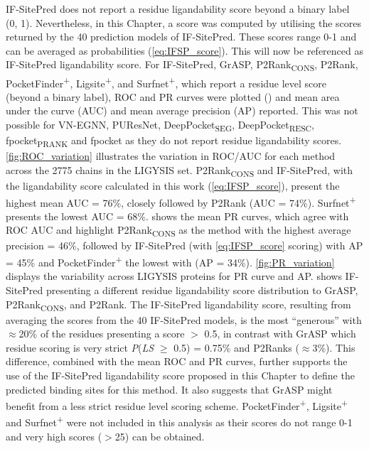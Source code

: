 IF-SitePred does not report a residue ligandability score beyond a binary label (0, 1). Nevertheless, in this Chapter, a score was computed by utilising the scores returned by the 40 prediction models of IF-SitePred. These scores range 0-1 and can be averaged as probabilities (\autoref{eq:IFSP_score}). This will now be referenced as IF-SitePred ligandability score. For IF-SitePred, GrASP, P2Rank\textsubscript{CONS}, P2Rank, PocketFinder\textsuperscript{+}, Ligsite\textsuperscript{+}, and Surfnet\textsuperscript{+}, which report a residue level score (beyond a binary label), ROC and PR curves were plotted () and mean area under the curve (AUC) and mean average precision (AP) reported. This was not possible for VN-EGNN, PUResNet, DeepPocket\textsubscript{SEG}, DeepPocket\textsubscript{RESC}, fpocket\textsubscript{PRANK} and fpocket as they do not report residue ligandability scores. \autoref{fig:ROC_variation} illustrates the variation in ROC/AUC for each method across the 2775 chains in the LIGYSIS set. P2Rank\textsubscript{CONS} and IF-SitePred, with the ligandability score calculated in this work (\autoref{eq:IFSP_score}), present the highest mean AUC = 76\%, closely followed by P2Rank (AUC = 74\%). Surfnet\textsuperscript{+} presents the lowest AUC = 68\%.  shows the mean PR curves, which agree with ROC AUC and highlight P2Rank\textsubscript{CONS} as the method with the highest average precision = 46\%, followed by IF-SitePred (with \autoref{eq:IFSP_score} scoring) with AP = 45\% and PocketFinder\textsuperscript{+} the lowest with (AP = 34\%). \autoref{fig:PR_variation} displays the variability across LIGYSIS proteins for PR curve and AP.  shows IF-SitePred presenting a different residue ligandability score distribution to GrASP, P2Rank\textsubscript{CONS}, and P2Rank. The IF-SitePred ligandability score, resulting from averaging the scores from the 40 IF-SitePred models, is the most ``generous'' with $\approx$20\% of the residues presenting a score $>$ 0.5, in contrast with GrASP which residue scoring is very strict \textit{P}(\textit{LS} $\geq$ 0.5) = 0.75\% and P2Ranks ($\approx$3\%). This difference, combined with the mean ROC and PR curves, further supports the use of the IF-SitePred ligandability score proposed in this Chapter to define the predicted binding sites for this method. It also suggests that GrASP might benefit from a less strict residue level scoring scheme. PocketFinder\textsuperscript{+}, Ligsite\textsuperscript{+} and Surfnet\textsuperscript{+} were not included in this analysis as their scores do not range 0-1 and very high scores ($>$25) can be obtained.

